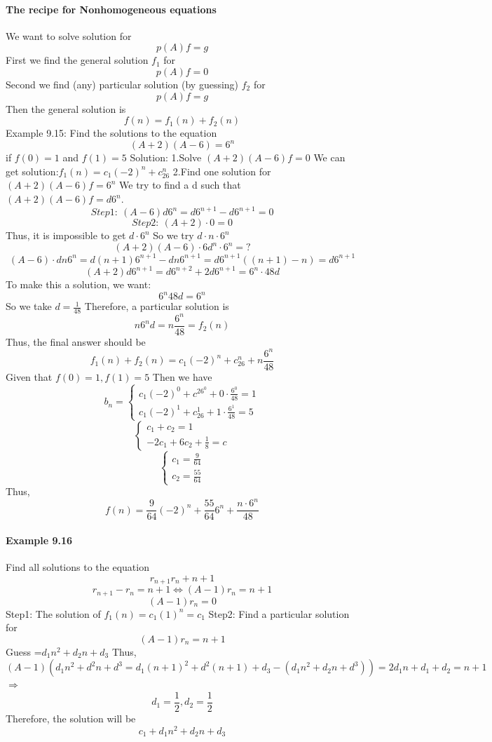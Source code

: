 \documentclass{article}
\begin{document}
\paragraph{The recipe for Nonhomogeneous equations}
We want to solve solution for 
$$p(A)f=g$$
First we find the general solution $f_1$ for
$$p(A)f=0$$
Second we find (any) particular solution (by guessing) $f_2$ for 
$$p(A)f=g$$
Then the general solution is
$$f(n)=f_1(n)+f_2(n)$$
Example 9.15:\newline
Find the solutions to the equation
$$(A+2)(A-6)=6^n$$
if $f(0)=1$ and $f(1)=5$
Solution:\newline
1.Solve $(A+2)(A-6)f=0$\newline
We can get solution:$f_1(n)=c_1(-2)^n+c_26^n$\newline
2.Find one solution for $(A+2)(A-6)f=6^n$\newline
We try to find a d such that $(A+2)(A-6)f=d6^n$.
$$Step1:\ (A-6)d6^n=d6^{n+1}-d6^{n+1}=0$$
$$Step2:\ (A+2)\cdot 0=0$$
Thus, it is impossible to get $d\cdot 6^n$ \newline
So we try $d\cdot n\cdot 6^n$
$$(A+2)(A-6)\cdot 6d^n\cdot 6^n=?$$
$$(A-6)\cdot dn6^n=d(n+1)6^{n+1}-dn6^{n+1}=d6^{n+1}((n+1)-n)=d6^{n+1}$$
$$(A+2)d6^{n+1}=d6^{n+2}+2d6^{n+1}=6^n\cdot 48d$$
To make this a solution, we want:
$$6^n48d=6^n$$
So we take $d=\frac{1}{48}$
Therefore, a particular solution is 
$$n6^nd=n\frac{6^n}{48}=f_2(n)$$
Thus, the final answer should be 
$$f_1(n)+f_2(n)=c_1(-2)^n+c_26^n+n\frac{6^n}{48}$$
Given that $f(0)=1,f(1)=5$\newline
Then we have 
$$b_n=\begin{cases}
    {c_1(-2)^0+c^26^0+0\cdot \frac{6^0}{48}=1}\\{c_1(-2)^1+c_26^1+1\cdot \frac{6^1}{48}=5}
\end{cases}$$
$$\begin{cases}
    {c_1+c_2=1}\\
    {-2c_1+6c_2+\frac{1}{8}=c}
\end{cases}$$
$$\begin{cases}
    {c_1=\frac{9}{64}}\\
    {c_2=\frac{55}{64}}
\end{cases}$$
Thus,$$f(n)=\frac{9}{64}(-2)^n+\frac{55}{64}6^n+\frac{n\cdot 6^n}{48}$$
\paragraph{Example 9.16}
Find all solutions to the equation
$$r_{n+1}r_n+n+1$$
$$r_{n+1}-r_n=n+1 \Longleftrightarrow (A-1)r_n=n+1$$
$$(A-1)r_n=0$$
Step1: The solution of $f_1(n)=c_1(1)^n=c_1$\newline
Step2: Find a particular solution for
$$(A-1)r_n=n+1$$
Guess =$d_1n^2+d_2n+d_3$
Thus,
$$(A-1)(d_1n^2+d^2n+d^3=d_1(n+1)^2+d^2(n+1)+d_3-(d_1n^2+d_2n+d^3))=2d_1n+d_1+d_2=n+1$$
$\Longrightarrow$
$$d_1=\frac{1}{2},d_2=\frac{1}{2}$$
Therefore, the solution will be
$$c_1+d_1n^2+d_2n+d_3$$
\end{document}
